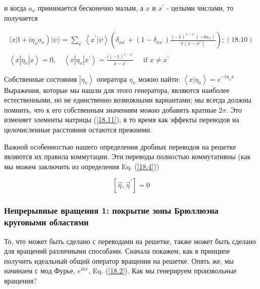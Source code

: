 \documentclass[main.tex]{subfiles}
\begin{document}
и когда $a_{x}$ принимается бесконечно малым, а $x$ и $x^{\prime}$ - целыми числами, то получается

\begin{equation}\label{18.11}
	\begin{array}{l}
{\left.\langle x| \mathbb{I}+i \eta_{x} a_{x}\right)|\psi\rangle=\sum_{x^{\prime}}\left\langle x^{\prime} | \psi\right\rangle\left(\delta_{x x^{\prime}}+\left(1-\delta_{x x^{\prime}}\right) \frac{(-1)^{x-x^{\prime}}\left(-\pi a_{x}\right)}{\pi\left(x-x^{\prime}\right)}\right) ;(18.10)} \\
{\left\langle x\left|\eta_{x}\right| x\right\rangle= 0, \quad\left\langle x\left|\eta_{x}\right| x^{\prime}\right\rangle=\frac{i(-1)^{x-x^{\prime}}}{x-x^{\prime}} \quad \text { if } x \neq x^{\prime}}
\end{array}
\end{equation}

Собственные состояния $\left|\eta_{x}\right\rangle$ оператора $\eta_{x}$ можно найти: $\left\langle x | \eta_{x}\right\rangle= e^{-i \eta_{x} x}$ Выражения, которые мы нашли для этого генератора, являются наиболее естественными, но не единственно возможными вариантами; мы всегда должны помнить, что к его собственным значениям можно добавить кратные $2 \pi$. Это изменяет элементы матрицы (\ref{18.11}), в то время как эффекты переводов на целочисленные расстояния остаются прежними.

Важной особенностью нашего определения дробных переводов на решетке являются их правила коммутации. Эти переводы полностью коммутативны (как мы можем заключить из определения Eq. (\ref{18.4}))

\begin{equation}\label{18.12}
	\left[\vec{\eta}, \vec{\eta}^{\prime}\right]=0
\end{equation}




\subsubsection{Непрерывные вращения 1: покрытие зоны Брюллюэна круговыми областями}\label{ch18.2.2}

То, что может быть сделано с переводами на решетке, также может быть сделано для вращений различными способами. Сначала покажем, как в принципе получить идеальный общий оператор вращения на решетке. Опять же, мы начинаем с мод Фурье, $e^{ikx}$, Eq. (\ref{18.2}). Как мы генерируем произвольные вращения?
\end{document}
